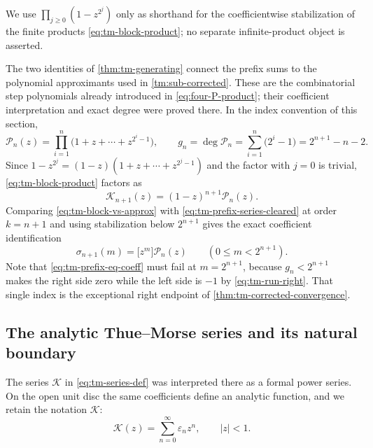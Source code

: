\documentclass[11pt,oneside]{article}
\theoremstyle{definition}
\theoremstyle{remark}
\begin{document}
We use \(\prod_{j\ge0}(1-z^{2^j})\) only as shorthand for the coefficientwise stabilization
of the finite products \eqref{eq:tm-block-product}; no separate infinite-product object is
asserted.

The two identities of \cref{thm:tm-generating} connect the prefix sums to the polynomial
approximants used in \cref{tm:sub-corrected}.  These are the combinatorial step polynomials
already introduced in \eqref{eq:four-P-product}; their coefficient interpretation and exact
degree were proved there.  In the index convention of this section,
\begin{equation}
 \mathcal P_n(z)=\prod_{i=1}^{n}\bigl(1+z+\cdots+z^{2^i-1}\bigr),
 \qquad
 g_n=\deg \mathcal P_n=\sum_{i=1}^{n}\bigl(2^i-1\bigr)=2^{n+1}-n-2.
                                                          \label{eq:tm-approx-poly}
\end{equation}
Since $1-z^{2^j}=(1-z)(1+z+\cdots+z^{2^j-1})$ and the factor with $j=0$ is trivial,
\eqref{eq:tm-block-product} factors as
\begin{equation}
 \mathcal K_{n+1}(z)=(1-z)^{n+1}\mathcal P_n(z).                    \label{eq:tm-block-vs-approx}
\end{equation}
Comparing \eqref{eq:tm-block-vs-approx} with \eqref{eq:tm-prefix-series-cleared} at order
$k=n+1$ and using stabilization below $2^{n+1}$ gives the exact coefficient identification
\begin{equation}
 \sigma_{n+1}(m)=\bigl[z^m\bigr]\mathcal P_n(z)\qquad(0\le m<2^{n+1}).
                                                          \label{eq:tm-prefix-eq-coeff}
\end{equation}
Note that \eqref{eq:tm-prefix-eq-coeff} must fail at $m=2^{n+1}$, because
$g_n<2^{n+1}$ makes the right side zero while the left side is $-1$ by
\eqref{eq:tm-run-right}.  That single index is the exceptional right endpoint of
\cref{thm:tm-corrected-convergence}.

\subsection{The analytic Thue--Morse series and its natural boundary}
\label{tm:sub-analytic-series}

The series \(\mathcal K\) in \eqref{eq:tm-series-def} was interpreted there as a formal
power series.  On the open unit disc the same coefficients define an analytic function,
and we retain the notation \(\mathcal K\):
\begin{equation}
 \mathcal K(z)=\sum_{n=0}^{\infty}\varepsilon_nz^n,
 \qquad |z|<1.                                                \label{eq:tm-disc-series}
\end{equation}
\end{document}
